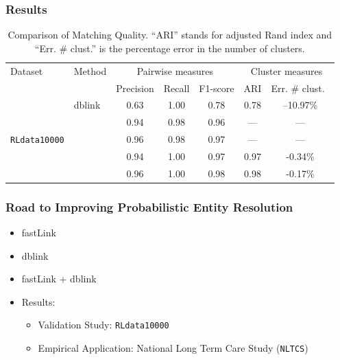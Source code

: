 \documentclass[9pt]{beamer}
\begin{document}
\begin{frame}
\frametitle{Results }
 
 
\begin{table}[h!]
	\centering
	\caption{Comparison of Matching Quality.
		``ARI'' stands for adjusted Rand index and ``Err. \# clust.'' 
		is the percentage error in the number of clusters.}
	\label{tbl:linkage-quality}
	\footnotesize
	\begin{tabular}{l l *{5}{c}}
		\toprule
		Dataset    & Method & \multicolumn{3}{c}{Pairwise measures} & \multicolumn{2}{c}{Cluster measures} \\
		\cmidrule(lr){3-5} \cmidrule(lr){6-7}
		& & Precision & Recall & F1-score & ARI & Err. \# clust.\ \\
		\midrule
		\multirow{5}{*}{\texttt{RLdata10000}}
		& dblink              & 0.63 & 1.00 & 0.78 & 0.78 & --10.97\% \\
		& \fLL   & 0.94	& 0.98	& 0.96 & --- & --- \\\
		& \fLS   &  0.96 & 0.98 & 0.97 & --- & --- \\
		& \fLdbL   & 0.94 & 1.00 & 0.97 & 0.97 & -0.34\% \\
		& \fLdbS    & 0.96 &  1.00 &  0.98 & 0.98 & -0.17\% \\
		\bottomrule
	\end{tabular}
\end{table}
 
\end{frame}


\begin{frame}[plain]
\frametitle{Road to Improving Probabilistic Entity Resolution}

\begin{itemize}
\item[{\color{orange!30} \bf 1.}] {\color{black!30} fastLink}
\vfill
\item[{\color{orange!30} \bf 2.}] {\color{black!30} dblink}
\vfill
\item[{\color{orange!30} \bf 3.}] {\color{black!30} fastLink + dblink }
\vfill
\item[{\color{orange} \bf 4.}] {\color{black} Results: }
\vfill
\begin{itemize}
\item[\TedBB] {\color{black!30} Validation Study: \texttt{RLdata10000} } \vfill
\item[\TedB] {\color{black} Empirical Application: National Long Term Care Study (\texttt{NLTCS})}
\end{itemize}
\vfill
\end{itemize}
\end{frame}
\end{document}

